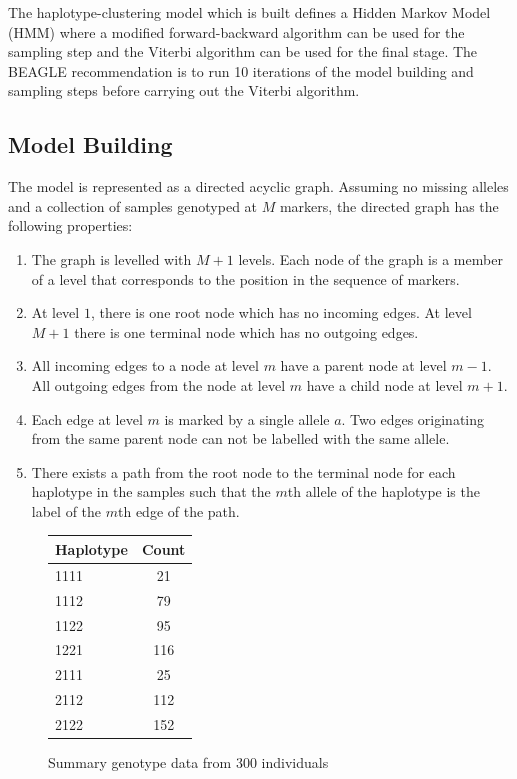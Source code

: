 \documentclass[a4paper,11pt,twoside,abstraction,titlepage]{article}
\begin{document}
The haplotype-clustering model which is built defines a Hidden Markov Model (HMM) where a modified forward-backward algorithm can be used for the sampling step and the Viterbi algorithm can be used for the final stage.  The BEAGLE recommendation is to run 10 iterations of the model building and sampling steps before carrying out the Viterbi algorithm.



\subsection{Model Building}
The model is represented as a directed acyclic graph.  Assuming no missing alleles and a collection of samples genotyped at $M$ markers, the directed graph has the following properties:

\vspace{-5pt}
\begin{enumerate}
\itemsep0pt
\item The graph is levelled with $M+1$ levels. Each node of the graph is a member of a level that corresponds to the position in the sequence of markers.
\item At level $1$, there is one root node which has no incoming edges.  At level $M+1$ there is one terminal node which has no outgoing edges.
\item All incoming edges to a node at level $m$ have a parent node at level $m-1$.  All outgoing edges from the node at level $m$ have a child node at level $m+1$.
\item Each edge at level $m$ is marked by a single allele $a$.  Two edges originating from the same parent node can not be labelled with the same allele.
\item There exists a path from the root node to the terminal node for each haplotype in the samples such that the $m$th allele of the haplotype is the label of the $m$th edge of the path.
\end{enumerate}


\begin{figure}[htp]
\centering
\begin{tabular}{lc}
\toprule
Haplotype & Count \\
\midrule
1111 & 21\\ 
1112 &  79\\
1122 & 95\\
1221 & 116 \\
2111 & 25\\
2112 & 112\\
2122 & 152\\
\bottomrule 
\end{tabular}
\vspace{5pt}
\caption{Summary genotype data from 300 individuals}

\vspace{-5pt}
\end{figure}
\end{document}
